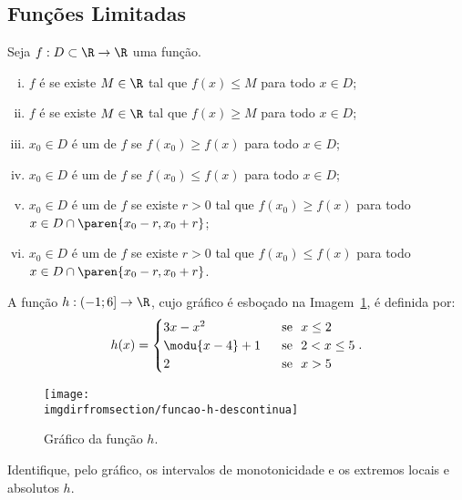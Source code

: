 \subsection{Funções Limitadas}

\begin{definition}
    Seja $f: D \subset \R \to \R$ uma função.
\begin{enumerate}[(i)]
  \item $f$ é  se existe $M \in \R$ tal
  que $f(x) \leq M$ para todo $x \in D$;
  \item $f$ é  se existe $M \in \R$ tal
  que $f(x) \geq M$ para todo $x \in D$;
  \item $x_0 \in D$ é um  de $f$ se
  $f(x_0) \geq f(x)$ para todo $x \in D$;
  \item $x_0 \in D$ é um  de $f$ se
  $f(x_0) \leq f(x)$ para todo $x \in D$;
  \item $x_0 \in D$ é um  de $f$ se
  existe $r>0$ tal que $f(x_0) \geq f(x)$ para todo $x \in D \cap \paren{x_0 - r , x_0+r}$;
  \item $x_0 \in D$ é um  de $f$ se
  existe $r>0$ tal que $f(x_0) \leq f(x)$ para todo $x \in D \cap \paren{x_0 - r ,
  x_0+r}$.
\end{enumerate}
\end{definition}

\begin{example}
    A função $h : \left( -1 ; 6 \right] \to \R$, cujo gráfico é esboçado
na Imagem~\ref{img:funcao-h-descontinua}, é definida por:
%
$$h(x) = \begin{cases}
                                3x-x^2 & \ \text{ se } \ x\leq 2 \\
                                \modu{x-4} +1 & \ \text{ se } \ 2 < x \leq 5 \\
                                2 & \ \text{ se } \ x > 5 \\
                                \end{cases}.$$
%
\begin{figure}
\centering
\texttt{[image: \\imgdirfromsection/funcao-h-descontinua]}
\caption{Gráfico da função $h$.}
\label{img:funcao-h-descontinua}
\end{figure}
%
Identifique, pelo gráfico, os intervalos de monotonicidade e os extremos locais e absolutos $h$.
\end{example}

